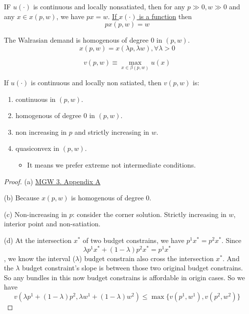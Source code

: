 \begin{proposition}
    IF $u(\cdot )$ is continuous and locally nonsatiated, then for any $p \gg 0, w \gg 0$ and any $x \in x(p,w)$, we have $px = w$. \underline{If $x(\cdot )$ is a function} then \[
        px(p,w) = w
    \]
\end{proposition}

\begin{proposition}
    The Walrasian demand is homogenous of degree $0$ in $(p,w)$. \[
        x(p,w) = x(\lambda p, \lambda w), \forall \lambda > 0
    \]
\end{proposition}


\begin{definition}
    \[
        v(p,w) \equiv \max_{x \in \beta(p,w)} u(x)
    \]
\end{definition}


\begin{proposition}
    If $u(\cdot )$ is continuous and locally non satiated, then $v(p,w)$ is: \begin{enumerate}
        \item continuous in $(p,w)$.
        \item homogenous of degree $0$ in $(p,w)$.
        \item non increasing in $p$ and strictly increasing in $w$.
        \item quasiconvex in $(p,w)$. \begin{itemize}
                  \item It means we prefer extreme not intermediate conditions.
              \end{itemize}
    \end{enumerate}
\end{proposition}

\begin{proof}
    (a) \underline{MGW 3. Appendix A}

    (b) Because $x(p,w)$ is homogenous of degree $0$.

    (c) Non-increasing in $p$: consider the corner solution. Strictly increasing in $w$, interior point and non-satiation.

    (d) At the intersection $x^*$ of two budget constrains, we have $p^1x^* = p^2 x^*$. Since \[
        \lambda p^1 x^* + (1-\lambda) p^2 x^* = p^1x^*
    \], we know the interval ($\lambda$) budget constrain also cross the intersection $x^*$. And the $\lambda$ budget constraint's slope is between those two original budget constrains. So any bundles in this now budget constrains is affordable in origin cases. So we have \[
        v(\lambda p^1 + (1-\lambda)p^2,\lambda w^1 + (1-\lambda) w^2) \leq \max\{v(p^1,w^1), v(p^2,w^2)\}
    \]
\end{proof}

